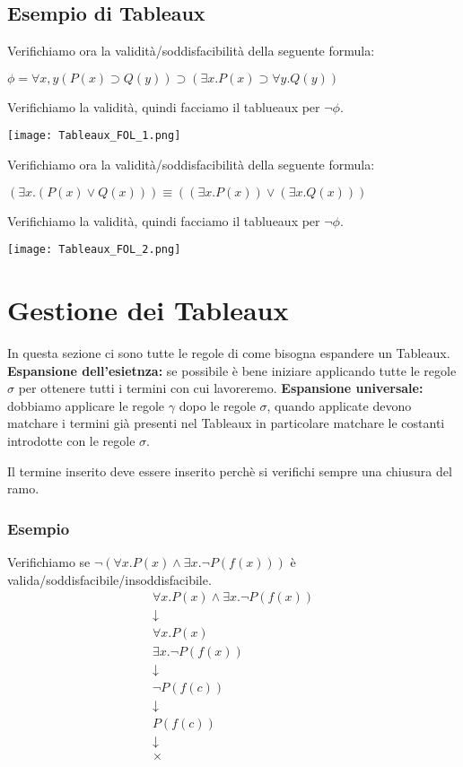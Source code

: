 \documentclass[../main.tex]{subfiles}
\newcommand{\spazio}{\vspace{1em} \newline}
\begin{document}
   \subsection{Esempio di Tableaux}
   Verifichiamo ora la validità/soddisfacibilità della seguente formula:
   \begin{center}
      $\phi =  \forall x, y(P(x) \supset Q(y))  \supset ( \exists x.P(x)  \supset  \forall y.Q(y))$
   \end{center}
   Verifichiamo la validità, quindi facciamo il tablueaux per $\lnot \phi$.
   \begin{center}
      \texttt{[image: Tableaux\_FOL\_1.png]}
   \end{center}
   \vspace{4ex}
   Verifichiamo ora la validità/soddisfacibilità della seguente formula:
   \begin{center}
      $( \exists x.(P(x)  \lor Q(x))) \equiv (( \exists x.P(x))  \lor ( \exists x.Q(x)))$
   \end{center}
   Verifichiamo la validità, quindi facciamo il tablueaux per $\lnot \phi$.
   \begin{center}
      \texttt{[image: Tableaux\_FOL\_2.png]}
   \end{center}

   \section{Gestione dei Tableaux}
   In questa sezione ci sono tutte le regole di come bisogna espandere un Tableaux.
   \spazio
   \textbf{Espansione dell'esietnza:} se possibile è bene iniziare applicando tutte le regole $\sigma$ per ottenere tutti i termini con cui lavoreremo.
   \spazio
   \textbf{Espansione universale:} dobbiamo applicare le regole $\gamma$ dopo le regole $\sigma$, quando applicate devono matchare i termini già presenti nel Tableaux in particolare matchare le costanti introdotte con le regole $\sigma$.

   Il termine inserito deve essere inserito perchè si verifichi sempre una chiusura del ramo.

   \subsubsection{Esempio}
   Verifichiamo se $\lnot (\forall x.P(x) \land \exists x. \lnot P(f(x)))$ è valida/soddisfacibile/insoddisfacibile.
   \begin{gather*}
      \forall x.P(x) \land \exists x. \lnot P(f(x))\\
      \downarrow\\
      \forall x.P(x)\\
      \exists x. \lnot P(f(x))\\
      \downarrow\\
      \lnot P(f(c))\\
      \downarrow\\
      P(f(c))\\
      \downarrow\\
      \times
   \end{gather*} 
\end{document}
